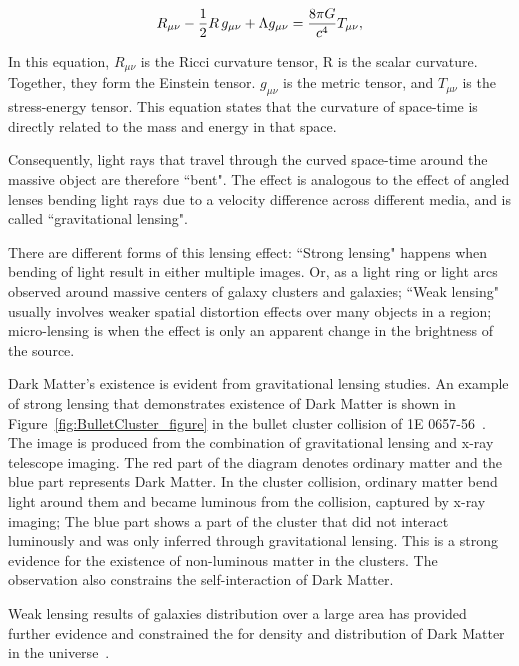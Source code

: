 \begin{equation}
	R_{\mu \nu} - {1 \over 2}R \, g_{\mu \nu} + \Lambda g_{\mu \nu}= {8 \pi G \over c^4} T_{\mu \nu}, 
    \label{eq:Einstein}
\end{equation}

In this equation, $R_{\mu \nu}$ is the Ricci curvature tensor, R is the scalar curvature. Together, they form the Einstein tensor. $g_{\mu \nu}$ is the metric tensor, and $T_{\mu \nu}$ is the stress-energy tensor. This equation states that the curvature of space-time is directly related to the mass and energy in that space. 	
	
	Consequently, light rays that travel through the curved space-time around the massive object are therefore ``bent". The effect is analogous to the effect of angled lenses bending light rays due to a velocity difference across different media, and is called ``gravitational lensing". 

    There are different forms of this lensing effect: ``Strong lensing" happens when bending of light result in either multiple images. Or, as a light ring or light arcs observed around massive centers of galaxy clusters and galaxies; ``Weak lensing" usually involves weaker spatial distortion effects over many objects in a region; micro-lensing is when the effect is only an apparent change in the brightness of the source.

    Dark Matter's existence is evident from gravitational lensing studies. An example of strong lensing that demonstrates existence of Dark Matter is shown in Figure~\ref{fig:BulletCluster_figure} in the bullet cluster collision of 1E 0657-56~\cite{BulletCluster}. The image is produced from the combination of gravitational lensing and x-ray telescope imaging. The red part of the diagram denotes ordinary matter and the blue part represents Dark Matter. In the cluster collision, ordinary matter
    bend light around them and became luminous from the collision, captured by x-ray imaging; The blue part shows a part of the cluster that did not interact luminously and was only inferred through gravitational lensing. This is a strong evidence for the existence of non-luminous matter in the clusters. The observation also constrains the self-interaction of Dark Matter.

    Weak lensing results of galaxies distribution over a large area has provided further evidence and constrained the for density and distribution of Dark Matter in the universe~\cite{wittman2000detection}.


